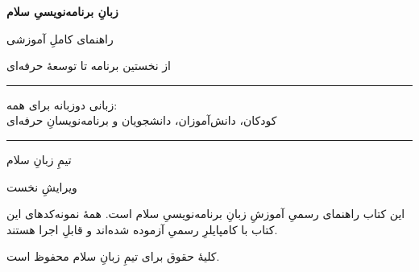 \documentclass[12pt,a4paper,openany]{book}
\makeatletter
\newcommand{\beginappendices}{\clearpage
  \setcounter{chapter}{0}\setcounter{section}{0}%
  \gdef\@chapapp{\appendixname}%
  \renewcommand{\thechapter}{\Alph{chapter}}%
  \renewcommand{\theHchapter}{app.\arabic{chapter}}%
  \renewcommand{\theHsection}{app.\arabic{chapter}.\arabic{section}}}
\makeatother
\begin{document}
\begin{titlepage}
\centering
\vspace*{2cm}
{\Huge\bfseries زبانِ برنامه‌نویسیِ سلام\par}
\vspace{0.6cm}
{\LARGE راهنمای کاملِ آموزشی\par}
\vspace{1.2cm}
{\large از نخستین برنامه تا توسعهٔ حرفه‌ای\par}
\vspace{2.5cm}
\rule{0.7\textwidth}{0.6pt}\par
\vspace{0.8cm}
{\large زبانی دوزبانه برای همه:\\[4pt]
کودکان، دانش‌آموزان، دانشجویان و برنامه‌نویسانِ حرفه‌ای\par}
\vspace{0.8cm}
\rule{0.7\textwidth}{0.6pt}\par
\vfill
{\large تیمِ زبانِ سلام\par}
\vspace{0.4cm}
{\normalsize ویرایشِ نخست\par}
\end{titlepage}

\thispagestyle{empty}
\noindent\small
این کتاب راهنمای رسمیِ آموزشِ زبانِ برنامه‌نویسیِ سلام است. همهٔ نمونه‌کدهای
این کتاب با کامپایلرِ رسمیِ  آزموده شده‌اند و قابلِ اجرا
هستند.\par
\vspace{0.3cm}
\noindent کلیهٔ حقوق برای تیمِ زبانِ سلام محفوظ است.\par
\normalsize
\clearpage



\tableofcontents
\clearpage

\mainmatter





















\beginappendices




\end{document}
